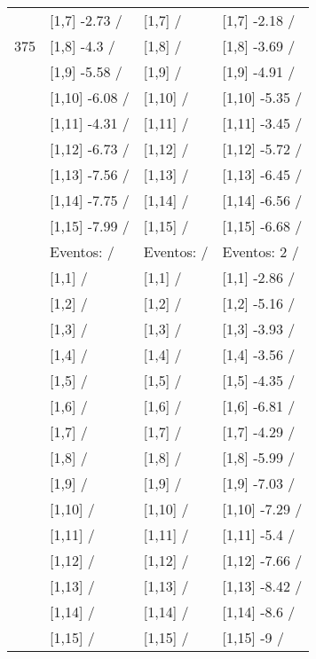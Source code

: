 \begin{table}
\begin{tabular}[t]{llll}
 & {}[1,7] -2.73  / & {}[1,7]  / & {}[1,7] -2.18  /\\
375 & {}[1,8] -4.3  / & {}[1,8]  / & {}[1,8] -3.69  /\\
\addlinespace
 & {}[1,9] -5.58  / & {}[1,9]  / & {}[1,9] -4.91  /\\
 & {}[1,10] -6.08  / & {}[1,10]  / & {}[1,10] -5.35  /\\
 & {}[1,11] -4.31  / & {}[1,11]  / & {}[1,11] -3.45  /\\
 & {}[1,12] -6.73  / & {}[1,12]  / & {}[1,12] -5.72  /\\
 & {}[1,13] -7.56  / & {}[1,13]  / & {}[1,13] -6.45  /\\
\addlinespace
 & {}[1,14] -7.75  / & {}[1,14]  / & {}[1,14] -6.56  /\\
 & {}[1,15] -7.99  / & {}[1,15]  / & {}[1,15] -6.68  /\\
 & Eventos:   / & Eventos:   / & Eventos:  2 /\\
 & {}[1,1]  / & {}[1,1]  / & {}[1,1] -2.86  /\\
 & {}[1,2]  / & {}[1,2]  / & {}[1,2] -5.16  /\\
\addlinespace
 & {}[1,3]  / & {}[1,3]  / & {}[1,3] -3.93  /\\
 & {}[1,4]  / & {}[1,4]  / & {}[1,4] -3.56  /\\
 & {}[1,5]  / & {}[1,5]  / & {}[1,5] -4.35  /\\
 & {}[1,6]  / & {}[1,6]  / & {}[1,6] -6.81  /\\
 & {}[1,7]  / & {}[1,7]  / & {}[1,7] -4.29  /\\
\addlinespace
500 & {}[1,8]  / & {}[1,8]  / & {}[1,8] -5.99  /\\
 & {}[1,9]  / & {}[1,9]  / & {}[1,9] -7.03  /\\
 & {}[1,10]  / & {}[1,10]  / & {}[1,10] -7.29  /\\
 & {}[1,11]  / & {}[1,11]  / & {}[1,11] -5.4  /\\
 & {}[1,12]  / & {}[1,12]  / & {}[1,12] -7.66  /\\
\addlinespace
 & {}[1,13]  / & {}[1,13]  / & {}[1,13] -8.42  /\\
 & {}[1,14]  / & {}[1,14]  / & {}[1,14] -8.6  /\\
 & {}[1,15]  / & {}[1,15]  / & {}[1,15] -9  /\\
\bottomrule
\end{tabular}
\end{table}
